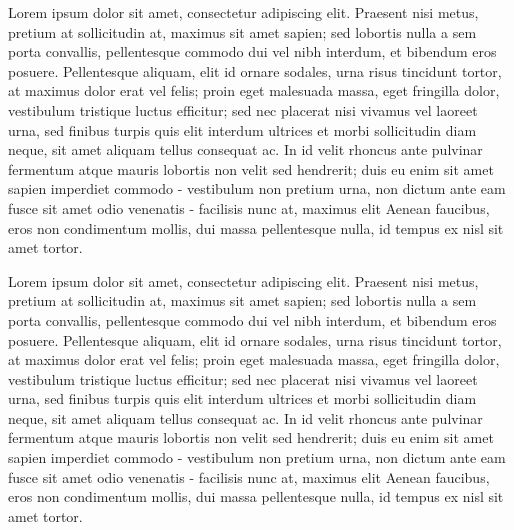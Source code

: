 \documentclass[10pt,a4paper]{book}
\begin{document}
Lorem ipsum dolor sit amet, consectetur adipiscing elit. Praesent nisi metus, pretium at sollicitudin at, maximus sit amet sapien; sed lobortis nulla a sem porta convallis, pellentesque commodo dui vel nibh interdum, et bibendum eros posuere. Pellentesque aliquam, elit id ornare sodales, urna risus tincidunt tortor, at maximus dolor erat vel felis; proin eget malesuada massa, eget fringilla dolor, vestibulum tristique luctus efficitur; sed nec placerat nisi vivamus vel laoreet urna, sed finibus turpis quis elit interdum ultrices et morbi sollicitudin diam neque, sit amet aliquam tellus consequat ac. In id velit rhoncus ante pulvinar fermentum atque mauris lobortis non velit sed hendrerit; duis eu enim sit amet sapien imperdiet commodo - vestibulum non pretium urna, non dictum ante eam fusce sit amet odio venenatis - facilisis nunc at, maximus elit Aenean faucibus, eros non condimentum mollis, dui massa pellentesque nulla, id tempus ex nisl sit amet tortor.

Lorem ipsum dolor sit amet, consectetur adipiscing elit. Praesent nisi metus, pretium at sollicitudin at, maximus sit amet sapien; sed lobortis nulla a sem porta convallis, pellentesque commodo dui vel nibh interdum, et bibendum eros posuere. Pellentesque aliquam, elit id ornare sodales, urna risus tincidunt tortor, at maximus dolor erat vel felis; proin eget malesuada massa, eget fringilla dolor, vestibulum tristique luctus efficitur; sed nec placerat nisi vivamus vel laoreet urna, sed finibus turpis quis elit interdum ultrices et morbi sollicitudin diam neque, sit amet aliquam tellus consequat ac. In id velit rhoncus ante pulvinar fermentum atque mauris lobortis non velit sed hendrerit; duis eu enim sit amet sapien imperdiet commodo - vestibulum non pretium urna, non dictum ante eam fusce sit amet odio venenatis - facilisis nunc at, maximus elit Aenean faucibus, eros non condimentum mollis, dui massa pellentesque nulla, id tempus ex nisl sit amet tortor.
\end{document}

